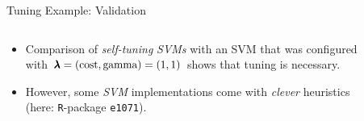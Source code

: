\begin{frame}{Tuning Example: Validation}

\begin{columns}
\begin{column}{0.3\textwidth}
  \footnotesize

  \begin{itemize}
    \item<1-> Comparison of \textit{self-tuning} \emph{SVMs} with an SVM that was configured with $\pmb{\lambda} = (\text{cost},\text{gamma}) = (1,1)$ shows that tuning is necessary.
    \item<2-> However, some \emph{SVM} implementations come with \emph{clever} heuristics (here: \texttt{R}-package \texttt{e1071}).
  \end{itemize}
\end{column}
\begin{column}{0.7\textwidth}
  \begin{center}
  \begin{figure}
  \end{figure}
  \end{center}
\end{column}
\end{columns}
\end{frame}


